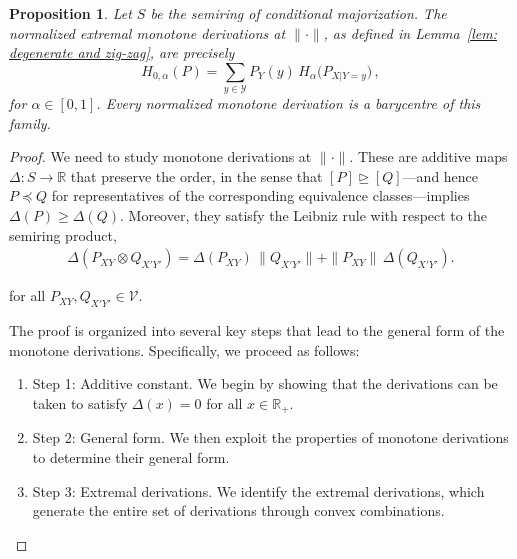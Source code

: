 \documentclass[aps,pra,11pt,onecolumn,nofootinbib,tightenlines]{revtex4-2}
\newtheorem{proposition}[theorem]{Proposition}
\theoremstyle{definition}
\newcommand{\V}{\mathcal{V}}
\newcommand{\rgeq}{\trianglerighteq}
\begin{document}
\begin{proposition}
\label{prop: monotone derivations}
Let \(S\) be the semiring of conditional majorization. The normalized
extremal monotone derivations at \(\|\cdot\|\), as defined in
Lemma~\ref{lem: degenerate and zig-zag}, are precisely
\begin{equation}
\label{eq:ExtDerivation}
H_{0,\alpha}(P)
= \sum_{y \in \mathcal{Y}} P_Y(y) \, H_\alpha\!\big(P_{X|Y = y}\big)\,,
\end{equation}
for \(\alpha\in[0,1]\). Every normalized monotone derivation is a barycentre
of this family.
\end{proposition}
\begin{proof}
We need to study monotone derivations at $\|\cdot\|$. These are additive maps \(\Delta \colon S \to \mathbb{R}\) that preserve the order, in the sense that \([P] \rgeq [Q]\)—and hence \(P \preceq Q\) for representatives of the corresponding equivalence classes—implies \(\Delta(P) \geq \Delta(Q)\). Moreover, they satisfy the Leibniz rule with respect to the semiring product,
\begin{align}\label{eq:LeibnizRule}
\Delta(P_{XY}\otimes Q_{X'Y'})
= \Delta(P_{XY})\,\|Q_{X'Y'}\|
+ \|P_{XY}\|\,\Delta(Q_{X'Y'}) .
\end{align}

for all $P_{XY},Q_{X'Y'}\in\V$.

The proof is organized into several key steps that lead to the general form of the monotone derivations. Specifically, we proceed as follows:
\begin{enumerate}
    \item Step 1: Additive constant. We begin by showing that the derivations can be taken to satisfy \(\Delta(x) = 0\) for all \(x \in \mathbb{R}_+\).
    \item Step 2: General form. We then exploit the properties of monotone derivations to determine their general form.
    \item Step 3: Extremal derivations. We identify the extremal derivations, which generate the entire set of derivations through convex combinations.
\end{enumerate}


\medskip


\end{proof}
\end{document}

